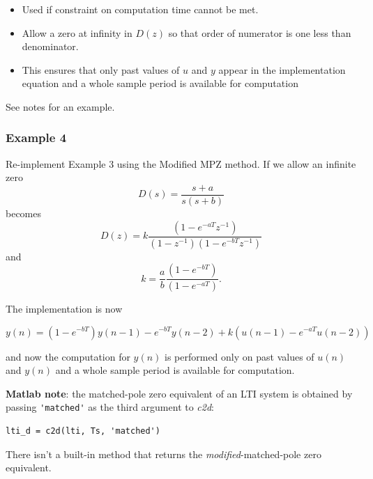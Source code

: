 \begin{slide}\label{slides:l11s26}
	\begin{itemize}
	\item
	Used if constraint on computation time cannot be met.
	
	\item Allow a zero at infinity in $D(z)$ so that order of numerator is one less than denominator.
	
	\item This ensures that only past values of $u$ and $y$ appear in the implementation equation and a whole sample period is available for computation
	
\end{itemize}
See notes for an example.
\end{slide}

\subsubsection*{Example 4}

Re-implement Example 3 using the Modified MPZ method. If we allow an infinite zero $$D(s)=\frac{s+a}{s(s+b)}$$ becomes $$D(z)=k\frac{(1-e^{-aT}z^{-1})}{(1-z^{-1})(1-e^{-bT}z^{-1})}$$ and $$k=\frac{a}{b}\frac{(1-e^{-bT})}{(1-e^{-aT})}.$$

The implementation is now

$$y(n) = (1 - e^{-bT})y(n-1)-e^{-bT}y(n-2)+k(u(n-1)-e^{-aT}u(n-2))$$

and now the computation for $y(n)$ is performed only on past values of $u(n)$ and $y(n)$ and a whole sample period is available for computation. 

\textbf{Matlab note}: the matched-pole zero equivalent of an LTI system is obtained by passing \verb|'matched'| as the third argument to \emph{c2d}:
\begin{verbatim}
lti_d = c2d(lti, Ts, 'matched')
\end{verbatim}
There isn't a built-in method that returns the \emph{modified}-matched-pole zero equivalent.


\endinput


